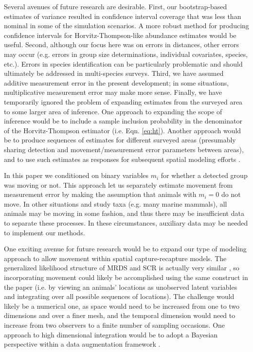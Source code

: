 \documentclass[12pt,fleqn]{article}
\begin{document}
Several avenues of future research are desirable.  First, our bootstrap-based estimates of variance resulted in confidence interval coverage that was less than nominal in some of the simulation scenarios.  A more robust method for producing confidence intervals for Horvitz-Thompson-like abundance estimates would be useful.  Second, although our focus here was on errors in distances, other errors may occur (e.g. errors in group size determinations, individual covariates, species, etc.).  Errors in species identification can be particularly problematic \citep[see e.g.][]{ConnEtAl2014} and should ultimately be addressed in multi-species surveys.  Third, we have assumed additive measurement error in the present development; in some situations, multiplicative measurement error \citep[whereby animals further away are subject to greater measurement error;][]{BorchersEtAl2010} may make more sense.  Finally, we have temporarily ignored the problem of expanding estimates from the surveyed area to some larger area of inference.  One approach to expanding the scope of inference would be to include a sample inclusion probability in the denominator of the Horvitz-Thompson estimator (i.e. Eqn. \ref{eq:ht}).  Another approach would be to produce sequences of estimates for different surveyed areas (presumably sharing detection and movement/measurement error parameters between areas), and to use such estimates as responses for subsequent spatial modeling efforts \citep[see e.g.][]{MillerEtAl2013}.

In this paper we conditioned on binary variables $m_i$ for whether a detected group was moving or not. This approach let us separately estimate movement from measurement error by making the assumption that animals with $m_i=0$ do not move.  In other situations and study taxa (e.g. many marine mammals), all animals may be moving in some fashion, and thus there may be insufficient data to separate these processes.  In these circumstances, auxiliary data \citep[e.g. animals with known location to estimate measurement error; cf.][]{BorchersEtAl2010} may be needed to implement our methods.

One exciting avenue for future research would be to expand our type of modeling approach to allow movement within spatial capture-recapture \citep[SCR; see e.g.][]{BorchersEfford2008,RoyleEtAl2013book} models.  The generalized likelihood structure of MRDS and SCR is actually very similar \citep{BorchersEtAl2015,BorchersMarques2017}, so incorporating movement could likely be accomplished using the same construct in the paper (i.e. by viewing an animals' locations as unobserved latent variables and integrating over all possible sequences of locations).  The challenge would likely be a numerical one, as space would need to be increased from one to two dimensions and over a finer mesh, and the temporal dimension would need to increase from two observers to a finite number of sampling occasions.  One approach to high dimensional integration would be to adopt a Bayesian perspective within a data augmentation framework \citep{RoyleEtAl2007b,ConnEtAl2012}.
\end{document}
